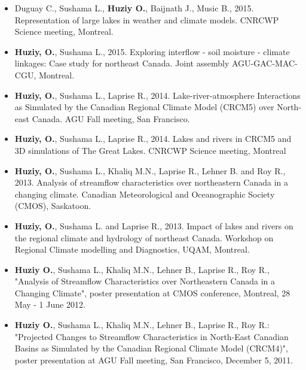 
\vspace{\vertspace}
\begin{itemize}


   \item Duguay C., Sushama L., \textbf{Huziy O.}, Baijnath J., Music B., 2015.
   Representation of large lakes in weather and climate models. CNRCWP Science
   meeting, Montreal.

   \item \textbf{Huziy, O.}, Sushama L., 2015. Exploring interflow - soil moisture - climate
   linkages: Case study for northeast Canada. Joint assembly AGU-GAC-MAC-CGU, Montreal.

   \item \textbf{Huziy, O.}, Sushama L., Laprise R., 2014. Lake-river-atmosphere Interactions
   as Simulated by the Canadian Regional Climate Model (CRCM5) over North-east
   Canada. AGU Fall meeting, San Francisco.

   \item \textbf{Huziy, O.}, Sushama L., Laprise R., 2014. Lakes and rivers in
   CRCM5 and 3D simulations of The Great Lakes. CNRCWP Science meeting, Montreal

   \item \textbf{Huziy, O.}, Sushama L., Khaliq M.N., Laprise R., Lehner B. and Roy
    R., 2013. Analysis of streamflow characteristics over northeastern Canada in a
    changing climate. Canadian Meteorological and Oceanographic Society (CMOS),
    Saskatoon.

   \item \textbf{Huziy, O.}, Sushama L. and Laprise R., 2013. Impact of lakes
   and rivers on the regional climate and hydrology of northeast Canada.
   Workshop on Regional Climate modelling and Diagnostics, UQAM, Montreal.

    \item \textbf{Huziy O.}, Sushama L., Khaliq M.N., Lehner B., Laprise R., Roy
    R., "Analysis of Streamflow Characteristics over Northeastern Canada in a
    Changing Climate", poster presentation at CMOS conference, Montreal, 28 May -
    1 June 2012.

    \item \textbf{Huziy O.}, Sushama L., Khaliq M.N., Lehner B., Laprise R., Roy
    R.: "Projected Changes to Streamflow Characteristics in North-East Canadian
    Basins as Simulated by the Canadian Regional Climate Model (CRCM4)", poster
    presentation at AGU Fall meeting, San Francisco, December 5, 2011.


\end{itemize}
